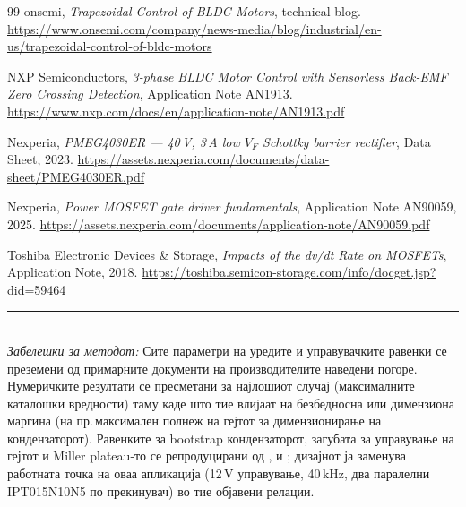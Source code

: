 \documentclass[11pt,a4paper]{article}
\newcommand{\eng}[1]{\textenglish{#1}}
\begin{document}
\begin{thebibliography}{99}
 onsemi, \emph{Trapezoidal Control of BLDC Motors}, technical blog. \url{https://www.onsemi.com/company/news-media/blog/industrial/en-us/trapezoidal-control-of-bldc-motors}

 NXP Semiconductors, \emph{3-phase BLDC Motor Control with Sensorless Back-EMF Zero Crossing Detection}, Application Note AN1913. \url{https://www.nxp.com/docs/en/application-note/AN1913.pdf}

 Nexperia, \emph{PMEG4030ER --- 40\,V, 3\,A low $V_{F}$ Schottky barrier rectifier}, Data Sheet, 2023. \url{https://assets.nexperia.com/documents/data-sheet/PMEG4030ER.pdf}

 Nexperia, \emph{Power MOSFET gate driver fundamentals}, Application Note AN90059, 2025. \url{https://assets.nexperia.com/documents/application-note/AN90059.pdf}

 Toshiba Electronic Devices \& Storage, \emph{Impacts of the dv/dt Rate on MOSFETs}, Application Note, 2018. \url{https://toshiba.semicon-storage.com/info/docget.jsp?did=59464}

\end{thebibliography}

\vspace{1em}
\noindent\rule{\textwidth}{0.4pt}\\[4pt]
{\small \emph{Забелешки за методот:} Сите параметри на уредите и управувачките равенки се преземени од примарните документи на производителите наведени погоре. Нумеричките резултати се пресметани за најлошиот случај (максималните каталошки вредности) таму каде што тие влијаат на безбедносна или димензиона маргина (на пр.\,максимален полнеж на гејтот за димензионирање на кондензаторот). Равенките за \eng{bootstrap} кондензаторот, загубата за управување на гејтот и \eng{Miller plateau}-то се репродуцирани од \cite{ref3}, \cite{ref5} и \cite{ref6,ref7,ref8,ref9}; дизајнот ја заменува работната точка на оваа апликација (12\,V управување, 40\,kHz, два паралелни IPT015N10N5 по прекинувач) во тие објавени релации.}
\end{document}
